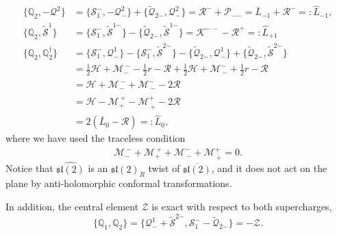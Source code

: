 \documentclass[a4paper,11pt]{article}
\begin{document}
\begin{equation}
\begin{aligned}
    \{\mathbb{Q}_2, - \mathcal{Q}^2\} &= \{\mathcal{S}_1^-, - \mathcal{Q}^2_-\} + \{\widetilde{\mathcal{Q}}_{2\dot{-}}, \mathcal{Q}^2_-\} = \mathcal{R}^- + \mathcal{P}_{- \dot{-}} = \bar{L}_{-1} + \mathcal{R}^- =:\widehat{L}_{-1},\\
    \{\mathbb{Q}_2, \widetilde{\mathcal{S}}^1\} &= \{\mathcal{S}_1^-, \widetilde{\mathcal{S}}^{1 \dot{-}}\} - \{\widetilde{\mathcal{Q}}_{2\dot{-}}, \widetilde{\mathcal{S}}^{1 \dot{-}}\} = \mathcal{K}^{\dot{-} -} - \mathcal{R}^+ =: \widehat{L}_{+1}\\
    \{\mathbb{Q}_2, \mathbb{Q}_2^\dagger\} &= \{\mathcal{S}_1^-, \mathcal{Q}^1_-\} - \{\mathcal{S}_1^-, \widetilde{\mathcal{S}}^{2 \dot{-}}\} - \{\widetilde{\mathcal{Q}}_{2\dot{-}}, \mathcal{Q}^1_-\} + \{\widetilde{\mathcal{Q}}_{2\dot{-}}, \widetilde{\mathcal{S}}^{2\dot{-}}\}\\
    &= \frac{1}{2} \mathcal{H} + \mathcal{M}_-^{~-} - \frac{1}{2}r - \mathcal{R} + \frac{1}{2}\mathcal{H} + \mathcal{M}^{\dot{-}}_{~\dot{-}} + \frac{1}{2} r - \mathcal{R}\\
    &= \mathcal{H} + \mathcal{M}_-^{~-} + \mathcal{M}^{\dot{-}}_{~\dot{-}} - 2\mathcal{R}\\
    &= \mathcal{H} - \mathcal{M}_+^{~+} - \mathcal{M}^{\dot{+}}_{~\dot{+}} - 2 \mathcal{R}\\
    &= 2(\bar{L}_0 - \mathcal{R}) = : \widehat{L}_0,
\end{aligned}
\end{equation}
where we have used the traceless condition
\begin{equation}
    \mathcal{M}_{-}^{~-} + \mathcal{M}_+^{~+} + \mathcal{M}^{\dot{-}}_{~\dot{-}} + \mathcal{M}^{\dot{+}}_{~\dot{+}} = 0.
\end{equation}
Notice  that $\widehat{\mathfrak{sl}(2)}$ is an $\mathfrak{sl}(2)_R$ twist of $\overline{\mathfrak{sl}(2)}$, and it does not act on the plane by anti-holomorphic conformal transformations.

In addition, the central element $\mathcal{Z}$ is exact with respect to both supercharges,
\begin{equation}
\{\mathbb{Q}_1, \mathbb{Q}_2\} = \{\mathcal{Q}^1_- + \widetilde{\mathcal{S}}^{2\dot{-}}, \mathcal{S}_1^- - \widetilde{\mathcal{Q}}_{2\dot{-}}\} = - \mathcal{Z}.
\end{equation}
\end{document}
